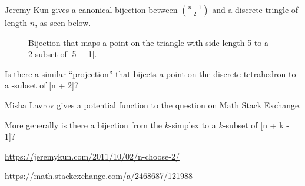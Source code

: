 \documentclass{article}
\begin{document}
Jeremy Kun gives a canonical bijection between $\displaystyle\binom{n + 1}{2}$ and a discrete
tringle of length $n$, as seen below.
\begin{figure}[!h]
  \centering
  \caption{Bijection that maps a point on the triangle with side length 5 to a 2-subset of [5 + 1].}
\end{figure}

\begin{question}
  Is there a similar ``projection'' that bijects a point on the discrete
  tetrahedron to a -subset of [n + 2]?
\end{question}

\begin{note}
  Misha Lavrov gives a potential function to the question on Math Stack Exchange.
\end{note}

\begin{related}
  \item More generally is there a bijection from the $k$-simplex to a $k$-subset of [n + k - 1]?
\end{related}

\begin{references}
  \item \url{https://jeremykun.com/2011/10/02/n-choose-2/}
  \item \url{https://math.stackexchange.com/a/2468687/121988}
\end{references}
\end{document}
